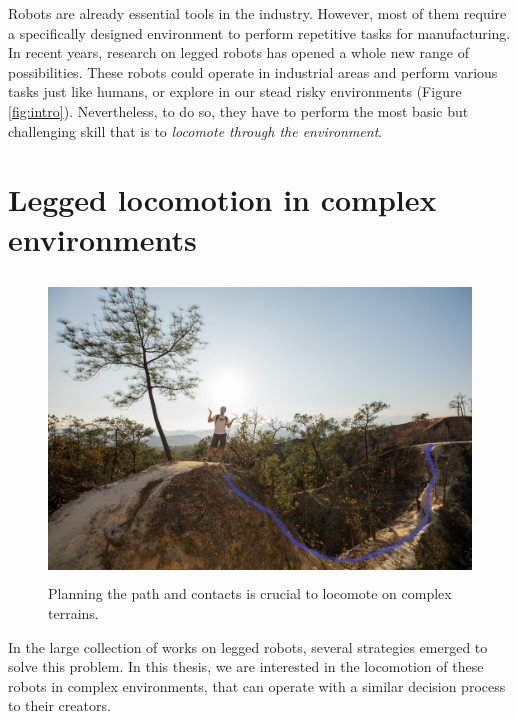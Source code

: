 



Robots are already essential tools in the industry. 
However, most of them require a specifically designed environment to perform repetitive tasks for manufacturing.
In recent years, research on legged robots has opened a whole new range of possibilities. %
These robots could operate in industrial areas and perform various tasks just like humans, or explore in our stead risky environments (Figure \ref{fig:intro}).
Nevertheless, to do so, they have to perform the most basic but challenging skill that is to \textit{locomote through the environment}.

\section{Legged locomotion in complex environments}
\begin{figure}[h]
    \centering
    \includegraphics[width=\textwidth, height=8cm, trim={10cm 0 0 8cm}, clip]{Figures/Chapter_INTRO/moi_chemin.jpg}
    \caption{Planning the path and contacts is crucial to locomote on complex terrains.}
    \label{fig:intro:moi_chemin}
\end{figure}
In the large collection of works on legged robots, several strategies emerged to solve this problem.
In this thesis, we are interested in the locomotion of these robots in complex environments, that can operate with a similar decision process to their creators.

